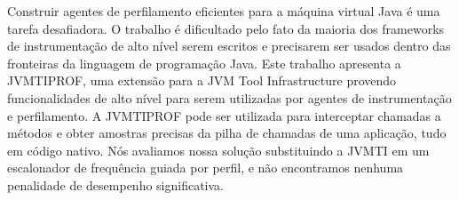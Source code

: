 Construir agentes de perfilamento eficientes para a máquina virtual Java é uma tarefa desafiadora. O trabalho é dificultado pelo fato da maioria dos frameworks de instrumentação de alto nível serem escritos e precisarem ser usados dentro das fronteiras da linguagem de programação Java. Este trabalho apresenta a JVMTIPROF, uma extensão para a JVM Tool Infrastructure provendo funcionalidades de alto nível para serem utilizadas por agentes de instrumentação e perfilamento. A JVMTIPROF pode ser utilizada para interceptar chamadas a métodos e obter amostras precisas da pilha de chamadas de uma aplicação, tudo em código nativo. Nós avaliamos nossa solução substituindo a JVMTI em um escalonador de frequência guiada por perfil, e não encontramos nenhuma penalidade de desempenho significativa.
